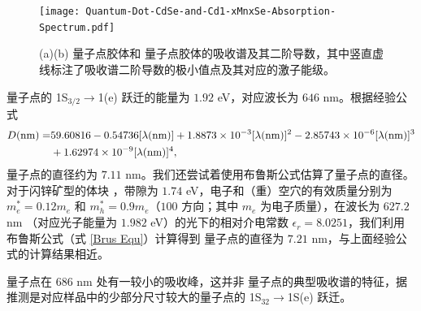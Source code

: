 \documentclass{thesis}
\begin{document}
\begin{figure}[h]
    \centering
    \texttt{[image: Quantum-Dot-CdSe-and-Cd1-xMnxSe-Absorption-Spectrum.pdf]}
    \caption{(a)(b)  量子点胶体和  量子点胶体的吸收谱及其二阶导数，其中竖直虚线标注了吸收谱二阶导数的极小值点及其对应的激子能级。}
    \label{Absorption spectrum}
\end{figure}

 量子点的 1S$_{3/2}\rightarrow$1(e) 跃迁的能量为 $1.92$ eV，对应波长为 $646$ nm。根据经验公式\cite{jasieniak2009re}
\begin{align}
    \notag D(\text{nm})=&59.60816-0.54736[\lambda(\text{nm})]+1.8873\times 10^{-3}[\lambda(\text{nm})]^2-2.85743\times 10^{-6}[\lambda(\text{nm})]^3\\
    &+1.62974\times 10^{-9}[\lambda(\text{nm})]^4,
\end{align}
量子点的直径约为 $7.11$ nm。我们还尝试着使用布鲁斯公式估算了量子点的直径。对于闪锌矿型的体块 ，带隙为 $1.74$ eV\cite{ninomiya1995optical,janowitz1994dielectric}，电子和（重）空穴的有效质量分别为 $m_e^*=0.12 m_e$ 和 $m_h^*=0.9 m_e$（$100$ 方向；其中 $m_e$ 为电子质量）\cite{kim1994optical}，在波长为 $627.2$ nm （对应光子能量为 $1.982$ eV）的光下的相对介电常数 $\epsilon_r=8.0251$\cite{reshak2006theoretical}，我们利用布鲁斯公式（式 \eqref{Brus Equ}）计算得到  量子点的直径为 $7.21$ nm，与上面经验公式的计算结果相近。

 量子点在 $686$ nm 处有一较小的吸收峰，这并非  量子点的典型吸收谱的特征，据推测是对应样品中的少部分尺寸较大的量子点的 1S$_{32}\rightarrow$1S(e) 跃迁。
\end{document}
